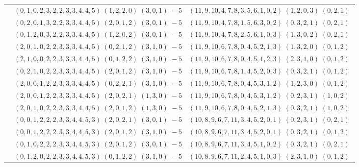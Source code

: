 \documentclass[11pt]{article}
\begin{document}
\begin{longtable}[l]{|c|c|c|}
 \cline{2-3} 
 & $(0 ,1 ,0 ,2 ,3 ,2 ,2 ,3 ,3 ,4 ,4 ,5) \;(1 ,2 ,2 ,0) \;(3 ,0 ,1) \;-5$ & $(11 ,9 ,10 ,4 ,7 ,8 ,3 ,5 ,6 ,1 ,0 ,2) \;(1 ,2 ,0 ,3) \;(0 ,2 ,1) \;$\\ 
 \cline{2-3} 
 & $(0 ,2 ,0 ,1 ,3 ,2 ,2 ,3 ,3 ,4 ,4 ,5) \;(2 ,0 ,1 ,2) \;(3 ,0 ,1) \;-5$ & $(11 ,9 ,10 ,4 ,7 ,8 ,1 ,5 ,6 ,3 ,0 ,2) \;(0 ,3 ,2 ,1) \;(0 ,2 ,1) \;$\\ 
 \cline{2-3} 
 & $(0 ,1 ,2 ,0 ,3 ,2 ,2 ,3 ,3 ,4 ,4 ,5) \;(1 ,2 ,0 ,2) \;(3 ,0 ,1) \;-5$ & $(11 ,9 ,10 ,4 ,7 ,8 ,2 ,5 ,6 ,1 ,0 ,3) \;(1 ,3 ,0 ,2) \;(0 ,2 ,1) \;$\\ 
 \cline{2-3} 
 & $(2 ,0 ,1 ,0 ,2 ,2 ,3 ,3 ,3 ,4 ,4 ,5) \;(0 ,2 ,1 ,2) \;(3 ,1 ,0) \;-5$ & $(11 ,9 ,10 ,6 ,7 ,8 ,0 ,4 ,5 ,2 ,1 ,3) \;(1 ,3 ,2 ,0) \;(0 ,1 ,2) \;$\\ 
 \cline{2-3} 
 & $(2 ,1 ,0 ,0 ,2 ,2 ,3 ,3 ,3 ,4 ,4 ,5) \;(0 ,1 ,2 ,2) \;(3 ,1 ,0) \;-5$ & $(11 ,9 ,10 ,6 ,7 ,8 ,0 ,4 ,5 ,1 ,2 ,3) \;(2 ,3 ,1 ,0) \;(0 ,1 ,2) \;$\\ 
 \cline{2-3} 
 & $(0 ,2 ,1 ,0 ,2 ,2 ,3 ,3 ,3 ,4 ,4 ,5) \;(2 ,0 ,1 ,2) \;(3 ,1 ,0) \;-5$ & $(11 ,9 ,10 ,6 ,7 ,8 ,1 ,4 ,5 ,2 ,0 ,3) \;(0 ,3 ,2 ,1) \;(0 ,1 ,2) \;$\\ 
 \cline{2-3} 
 & $(2 ,0 ,0 ,1 ,2 ,2 ,3 ,3 ,3 ,4 ,4 ,5) \;(0 ,2 ,2 ,1) \;(3 ,1 ,0) \;-5$ & $(11 ,9 ,10 ,6 ,7 ,8 ,0 ,4 ,5 ,3 ,1 ,2) \;(1 ,2 ,3 ,0) \;(0 ,1 ,2) \;$\\ 
 \cline{2-3} 
 & $(2 ,0 ,0 ,1 ,2 ,2 ,3 ,3 ,3 ,4 ,4 ,5) \;(2 ,0 ,2 ,1) \;(1 ,3 ,0) \;-5$ & $(11 ,9 ,10 ,6 ,7 ,8 ,0 ,4 ,5 ,3 ,1 ,2) \;(0 ,2 ,3 ,1) \;(1 ,0 ,2) \;$\\ 
 \cline{2-3} 
 & $(2 ,0 ,1 ,0 ,2 ,2 ,3 ,3 ,3 ,4 ,4 ,5) \;(2 ,0 ,1 ,2) \;(1 ,3 ,0) \;-5$ & $(11 ,9 ,10 ,6 ,7 ,8 ,0 ,4 ,5 ,2 ,1 ,3) \;(0 ,3 ,2 ,1) \;(1 ,0 ,2) \;$\\ 
 \cline{2-3} 
 & $(0 ,0 ,1 ,2 ,2 ,2 ,3 ,3 ,4 ,4 ,5 ,3) \;(2 ,0 ,2 ,1) \;(3 ,0 ,1) \;-5$ & $(10 ,8 ,9 ,6 ,7 ,11 ,3 ,4 ,5 ,2 ,0 ,1) \;(0 ,2 ,3 ,1) \;(0 ,2 ,1) \;$\\ 
 \cline{2-3} 
 & $(0 ,0 ,1 ,2 ,2 ,2 ,3 ,3 ,4 ,4 ,5 ,3) \;(2 ,0 ,1 ,2) \;(3 ,1 ,0) \;-5$ & $(10 ,8 ,9 ,6 ,7 ,11 ,3 ,4 ,5 ,2 ,0 ,1) \;(0 ,3 ,2 ,1) \;(0 ,1 ,2) \;$\\ 
 \cline{2-3} 
 & $(0 ,1 ,0 ,2 ,2 ,2 ,3 ,3 ,4 ,4 ,5 ,3) \;(2 ,0 ,1 ,2) \;(3 ,0 ,1) \;-5$ & $(10 ,8 ,9 ,6 ,7 ,11 ,3 ,4 ,5 ,1 ,0 ,2) \;(0 ,3 ,2 ,1) \;(0 ,2 ,1) \;$\\ 
 \cline{2-3} 
 & $(0 ,1 ,2 ,0 ,2 ,2 ,3 ,3 ,4 ,4 ,5 ,3) \;(0 ,1 ,2 ,2) \;(3 ,1 ,0) \;-5$ & $(10 ,8 ,9 ,6 ,7 ,11 ,2 ,4 ,5 ,1 ,0 ,3) \;(2 ,3 ,1 ,0) \;(0 ,1 ,2) \;$\\ 

\end{longtable}
\end{document}
